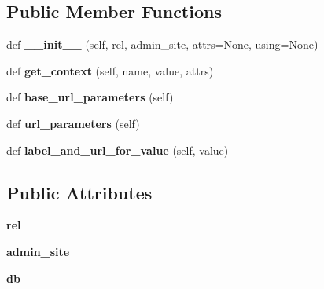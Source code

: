 \subsection*{Public Member Functions}
\begin{DoxyCompactItemize}
\item 
\mbox{\label{classdjango_1_1contrib_1_1admin_1_1widgets_1_1_foreign_key_raw_id_widget_a9831552251b5eb8e3d2dbe8c8fe4dc69}} 
def {\bfseries \+\_\+\+\_\+init\+\_\+\+\_\+} (self, rel, admin\+\_\+site, attrs=None, using=None)
\item 
\mbox{\label{classdjango_1_1contrib_1_1admin_1_1widgets_1_1_foreign_key_raw_id_widget_a5ffc65e59bb1270d3152f0354aae4e6a}} 
def {\bfseries get\+\_\+context} (self, name, value, attrs)
\item 
\mbox{\label{classdjango_1_1contrib_1_1admin_1_1widgets_1_1_foreign_key_raw_id_widget_acdedad6d091d9b0cae16fcd2db23296c}} 
def {\bfseries base\+\_\+url\+\_\+parameters} (self)
\item 
\mbox{\label{classdjango_1_1contrib_1_1admin_1_1widgets_1_1_foreign_key_raw_id_widget_a0a6f026df1114039f229fc147c9d7911}} 
def {\bfseries url\+\_\+parameters} (self)
\item 
\mbox{\label{classdjango_1_1contrib_1_1admin_1_1widgets_1_1_foreign_key_raw_id_widget_a3c1c6692c201748fcb26623ccf66abf7}} 
def {\bfseries label\+\_\+and\+\_\+url\+\_\+for\+\_\+value} (self, value)
\end{DoxyCompactItemize}
\subsection*{Public Attributes}
\begin{DoxyCompactItemize}
\item 
\mbox{\label{classdjango_1_1contrib_1_1admin_1_1widgets_1_1_foreign_key_raw_id_widget_ad5ab0df00f96df6bad9cd4958c0c286b}} 
{\bfseries rel}
\item 
\mbox{\label{classdjango_1_1contrib_1_1admin_1_1widgets_1_1_foreign_key_raw_id_widget_a784feec0cafb5e2c86752b63eaf22cb9}} 
{\bfseries admin\+\_\+site}
\item 
\mbox{\label{classdjango_1_1contrib_1_1admin_1_1widgets_1_1_foreign_key_raw_id_widget_a28676d92491ac64679d11099498a6f5e}} 
{\bfseries db}
\end{DoxyCompactItemize}
